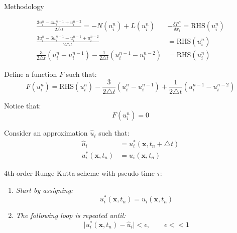 \documentclass{beamer}
\newcommand{\timestep}{ \triangle t }
\begin{document}
\begin{frame}{Methodology}
	\framebreak
	
	\begin{align}
		\frac{ 3 u_i^n - 4 u_i^{n-1} + u_i^{n-2} }{ 2 \timestep } = - N (u_i^n) + L(u_i^n) &- \frac{\delta P^n}{\delta x_i} = \text{RHS}(u_i^n) \\
		\frac{ 3 u_i^n - 3 u_i^{n-1} - u_i^{n-1} + u_i^{n-2} }{ 2 \timestep } &= \text{RHS}(u_i^n) \\
		\frac{3}{2 \timestep} \left( u_i^n - u_i^{n-1} \right) - \frac{1}{2 \timestep} \left( u_i^{n-1} - u_i^{n-2} \right) &= \text{RHS}(u_i^n)
	\end{align}
	
	Define a function $F$ such that:
	\begin{equation}
		F(u_i^n) = \text{RHS}(u_i^n) - \frac{3}{2 \timestep} \left( u_i^n - u_i^{n-1} \right) + \frac{1}{2 \timestep} \left( u_i^{n-1} - u_i^{n-2} \right)
	\end{equation}
	
	Notice that:
	\begin{equation}
		F(u_i^n) = 0
	\end{equation}
	
	\framebreak
	
	Consider an approximation $\hat{u}_i$ such that:
	\begin{align}
		\hat{u}_i &= u_i^*(\mathbf{x}, t_n + \timestep) \\
		u_i^*(\mathbf{x}, t_n) &= u_i(\mathbf{x}, t_n)
	\end{align}
	
	4th-order Runge-Kutta scheme with pseudo time $\tau$:
	\begin{enumerate}
		\item \emph{Start by assigning:}
			\begin{equation}
				u_i^*(\mathbf{x}, t_n) = u_i(\mathbf{x}, t_n)
			\end{equation}
		\item \emph{The following loop is repeated until:}
			\begin{equation}
				\mid u_i^*(\mathbf{x}, t_n) - \hat{u}_i \mid < \epsilon, \qquad \epsilon << 1
			\end{equation}
			

\end{enumerate}
\end{frame}
\end{document}
